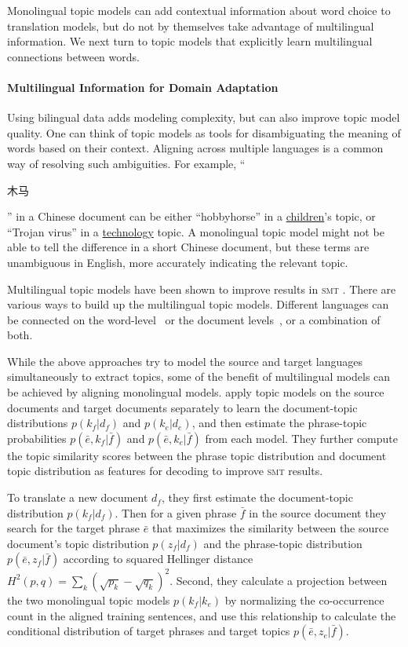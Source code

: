 Monolingual topic models can add contextual information about word choice to translation models, but do not by themselves take advantage of multilingual information.
We next turn to topic models that explicitly learn multilingual connections between words.

\paragraph{Multilingual Information for Domain Adaptation}

Using bilingual data adds modeling complexity, but can also improve topic model quality.
One can think of topic models as tools for disambiguating the meaning of words based on their context. 
Aligning across multiple languages is a common way of resolving such ambiguities.
 For example, ``\begin{CJK*}{UTF8}{gbsn}木马\end{CJK*}'' in a Chinese
  document can be either ``hobbyhorse'' in a \underline{children}'s
  topic, or ``Trojan virus'' in a \underline{technology} topic.  
  A monolingual topic model might not be able to tell the difference in a short Chinese document, but these terms
  are unambiguous in English, more accurately indicating the relevant topic.

Multilingual topic models have been shown to improve results in \textsc{smt} \citet{Eidelman-12}.
There are various ways to build up the multilingual topic
models. Different languages can be connected on the
word-level~\citep{boyd-graber-07,andrzejewski-09,hu-14:itm} or the
document levels~\citep{mimno-09}, or a combination of both\citet{hu-14}. 

While the above approaches try to model the source and target
languages simultaneously to extract topics, some of the benefit of multilingual models can be achieved by aligning monolingual models. \citet{xiao-12} apply
topic models on the source documents and target documents separately
to learn the document-topic distributions $p(k_f | d_f)$ and $p(k_e |
d_e)$, and then estimate the phrase-topic probabilities $p(\bar{e}, k_f
| \bar{f})$ and $p(\bar{e}, k_e | \bar{f})$ from each model. They further
compute the topic similarity scores between the phrase topic
distribution and document topic distribution as features for decoding
to improve \textsc{smt} results.

To translate a new document $d_f$, they first estimate the document-topic distribution $p(k_f |
d_f)$.
Then for a given phrase $\bar{f}$ in the source document they search for the target phrase $\bar{e}$ that maximizes the similarity between the source document's topic distribution $p(z_f|d_f)$ and the phrase-topic distribution $p(\bar{e}, z_f|\bar{f})$ according to squared Hellinger distance $H^2(p,q) = \sum_k \left(\sqrt{p_k} - \sqrt{q_k} \right)^2$.
Second, they calculate a projection between the two monolingual topic models $p(k_f
| k_e)$  by normalizing the co-occurrence count in the aligned training
sentences, and use this relationship to calculate the conditional distribution of target phrases and target topics $p(\bar{e}, z_e|\bar{f})$.

